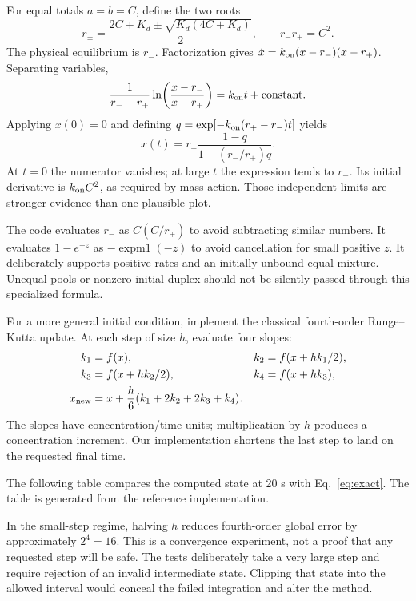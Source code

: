 For equal totals $a=b=C$, define the two roots
\begin{equation}
 r_\pm=\frac{2C+K_d\pm\sqrt{K_d(4C+K_d)}}2,\qquad
 r_-r_+=C^2.
\end{equation}
The physical equilibrium is $r_-$. Factorization gives
$\dot x=k_{\rm on}(x-r_-)(x-r_+)$. Separating variables,
\begin{equation}
 \frac1{r_--r_+}\ln\!\left(\frac{x-r_-}{x-r_+}\right)
   =k_{\rm on}t+\text{constant}.
\end{equation}
Applying $x(0)=0$ and defining
$q=\exp[-k_{\rm on}(r_+-r_-)t]$ yields
\begin{equation}
 x(t)=r_-\frac{1-q}{1-(r_-/r_+)q}.
 \label{eq:exact}
\end{equation}
At $t=0$ the numerator vanishes; at large $t$ the expression tends to $r_-$.
Its initial derivative is $k_{\rm on}C^2$, as required by mass action.
Those independent limits are stronger evidence than one plausible plot.


The code evaluates $r_-$ as $C(C/r_+)$ to avoid subtracting similar numbers.
It evaluates $1-e^{-z}$ as $-\operatorname{expm1}(-z)$ to avoid cancellation
for small positive $z$. It deliberately supports positive rates and an
initially unbound equal mixture. Unequal pools or nonzero initial duplex
should not be silently passed through this specialized formula.

For a more general initial condition, implement the classical fourth-order
Runge--Kutta update. At each step of size $h$, evaluate four slopes:
\begin{align}
 k_1&=f(x),& k_2&=f(x+hk_1/2),\\
 k_3&=f(x+hk_2/2),& k_4&=f(x+hk_3),\\
 x_{\rm new}&=x+\frac h6(k_1+2k_2+2k_3+k_4).
\end{align}
The slopes have concentration/time units; multiplication by $h$ produces
a concentration increment. Our implementation shortens the last step to
land on the requested final time.


The following table compares the computed state at 20 s with
Eq.~\ref{eq:exact}. The table is generated from the reference implementation.
\begin{center}\end{center}
In the small-step regime, halving $h$ reduces fourth-order global error
by approximately $2^4=16$. This is a convergence experiment, not a proof
that any requested step will be safe. The tests deliberately take a very
large step and require rejection of an invalid intermediate state.
Clipping that state into the allowed interval would conceal the failed
integration and alter the method.

